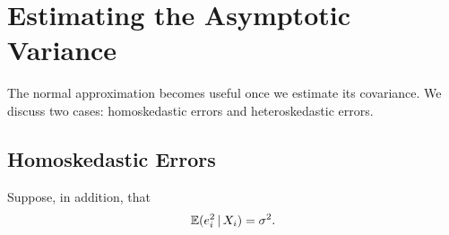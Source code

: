 \documentclass[a4paper,12pt]{article}
\begin{document}

\section{Estimating the Asymptotic Variance}

The normal approximation becomes useful once we estimate its covariance.
We discuss two cases: homoskedastic errors and heteroskedastic errors.

\subsection{Homoskedastic Errors}

\begin{assumption}\label{ass-homoskedasticity}
	Suppose, in addition, that
	\begin{align}\label{eq-constant-second-moment}
		\operatorname{\mathbb{E}}(e_i^2\mathpunct{}|\mathpunct{} X_i)=\sigma^2.
	\end{align}
\end{assumption}
\end{document}
